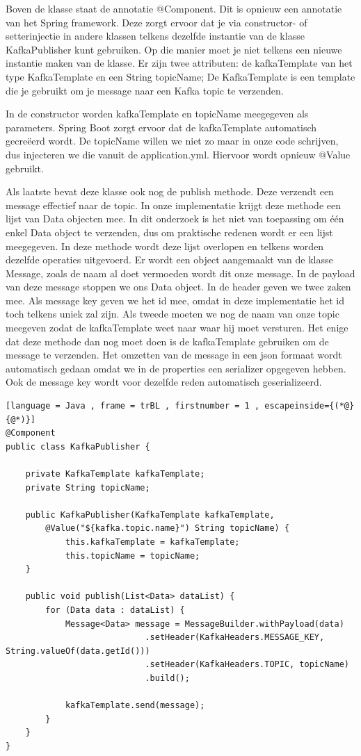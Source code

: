 Boven de klasse staat de annotatie @Component. Dit is opnieuw een annotatie van het Spring framework. Deze zorgt ervoor dat je via constructor- of setterinjectie in andere klassen telkens dezelfde instantie van de klasse KafkaPublisher kunt gebruiken. Op die manier moet je niet telkens een nieuwe instantie maken van de klasse. Er zijn twee attributen: de kafkaTemplate van het type KafkaTemplate en een String topicName; De KafkaTemplate is een template die je gebruikt om je message naar een Kafka topic te verzenden.

In de constructor worden kafkaTemplate en topicName meegegeven als parameters. Spring Boot zorgt ervoor dat de kafkaTemplate automatisch gecreëerd wordt. De topicName willen we niet zo maar in onze code schrijven, dus injecteren we die vanuit de application.yml. Hiervoor wordt opnieuw @Value gebruikt.

Als laatste bevat deze klasse ook nog de publish methode. Deze verzendt een message effectief naar de topic. In onze implementatie krijgt deze methode een lijst van Data objecten mee. In dit onderzoek is het niet van toepassing om één enkel Data object te verzenden, dus om praktische redenen wordt er een lijst meegegeven. In deze methode wordt deze lijst overlopen en telkens worden dezelfde operaties uitgevoerd. Er wordt een object aangemaakt van de klasse Message, zoals de naam al doet vermoeden wordt dit onze message. In de payload van deze message stoppen we ons Data object. In de header geven we twee zaken mee. Als message key geven we het id mee, omdat in deze implementatie het id toch telkens uniek zal zijn. Als tweede moeten we nog de naam van onze topic meegeven zodat de kafkaTemplate weet naar waar hij moet versturen. Het enige dat deze methode dan nog moet doen is de kafkaTemplate gebruiken om de message te verzenden. Het omzetten van de message in een json formaat wordt automatisch gedaan omdat we in de properties een serializer opgegeven hebben. Ook de message key wordt voor dezelfde reden automatisch geserializeerd. 

\begin{lstlisting}[language = Java , frame = trBL , firstnumber = 1 , escapeinside={(*@}{@*)}]
@Component
public class KafkaPublisher {

    private KafkaTemplate kafkaTemplate;
    private String topicName;

    public KafkaPublisher(KafkaTemplate kafkaTemplate,
        @Value("${kafka.topic.name}") String topicName) {
            this.kafkaTemplate = kafkaTemplate;
            this.topicName = topicName;
    }

    public void publish(List<Data> dataList) {
        for (Data data : dataList) {
            Message<Data> message = MessageBuilder.withPayload(data)
                            .setHeader(KafkaHeaders.MESSAGE_KEY, String.valueOf(data.getId()))
                            .setHeader(KafkaHeaders.TOPIC, topicName)
                            .build();

            kafkaTemplate.send(message);
        }
    }
}
\end{lstlisting}
